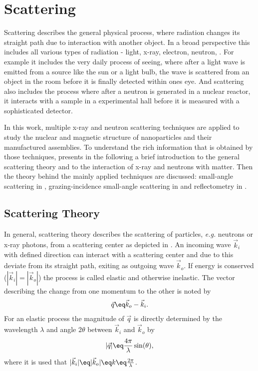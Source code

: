 \documentclass[\main/dresen_thesis.tex]{subfiles}
\begin{document}
\section{Scattering}\label{sec:theoreticalBackground:scattering}
Scattering describes the general physical process, where radiation changes its straight path due to interaction with another object.
In a broad perspective this includes all various types of radiation - light, x-ray, electron, neutron, \etc .
For example it includes the very daily process of seeing, where after a light wave is emitted from a source like the sun or a light bulb, the wave is scattered from an object in the room before it is finally detected within ones eye.
And scattering also includes the process where after a neutron is generated in a nuclear reactor, it interacts with a sample in a experimental hall before it is measured with a sophisticated detector.

In this work, multiple x-ray and neutron scattering techniques are applied to study the nuclear and magnetic structure of nanoparticles and their manufactured assemblies.
To understand the rich information that is obtained by those techniques,  presents in the following a brief introduction to the general scattering theory and  to the interaction of x-ray and neutrons with matter.
Then the theory behind the mainly applied techniques are discussed: small-angle scattering in , grazing-incidence small-angle scattering in  and reflectometry in .
\subsection{Scattering Theory}\label{sec:theoreticalBackground:scattering:scatteringTheory}
In general, scattering theory describes the scattering of particles, \textit{e.g.} neutrons or x-ray photons, from a scattering center as depicted in . An incoming wave $\vec{k}_i$ with defined direction can interact with a scattering center and due to this deviate from its straight path, exiting as outgoing wave $\vec{k}_o$.
If energy is conserved ($|\vec{k}_i| = |\vec{k}_o|$) the process is called elastic and otherwise inelastic.
The vector describing the change from one momentum to the other is noted by
\begin{align}
  \vec{q} \eq \vec{k}_o - \vec{k}_i.
\end{align}
For an elastic process the magnitude of $\vec{q}$ is directly determined by the wavelength $\lambda$ and angle $2\theta$ between $\vec{k}_i$ and $\vec{k}_o$ by
\begin{align}
  |\vec{q}| \eq \frac{4 \pi}{\lambda} \sin(\theta),
\end{align}
where it is used that $|\vec{k}_i| \eq |\vec{k}_o| \eq k \eq \frac{2 \pi}{\lambda}$.
\end{document}
